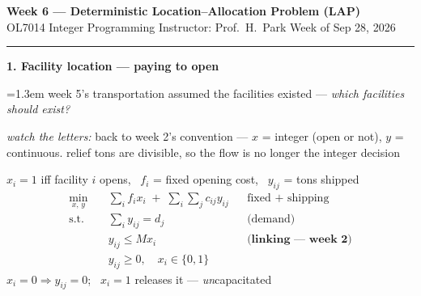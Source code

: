\documentclass[10pt]{article}
\newcommand{\beat}[2]{%
  \par\medskip\needspace{8\baselineskip}%
  {\color{ruleink}\rule{\textwidth}{1pt}}\par\nobreak\vspace{2pt}
  {\large\bfseries #1.\; #2}\par\nobreak\vspace{3pt}}
\newenvironment{board}{%
  \par\vspace{2pt}
  \begingroup\leftskip=1.3em\relax}{%
  \par\endgroup\vspace{2pt}}
\begin{document}
{\Large\bfseries Week 6 --- Deterministic Location--Allocation Problem (LAP)}\\[2pt]
{\small OL7014 Integer Programming \quad\textbullet\quad Instructor: Prof.\ H.\ Park \quad\textbullet\quad Week of Sep 28, 2026}

\beat{1}{Facility location --- paying to open}
\begin{board}
week 5's transportation assumed the facilities existed --- \emph{which facilities should exist?}
\vspace{2pt}

\emph{watch the letters:} back to week 2's convention --- $x$ = integer (open or not), $y$ = continuous.
relief tons are divisible, so the flow is no longer the integer decision
\vspace{2pt}

$x_i = 1$ iff facility $i$ opens, \ $f_i$ = fixed opening cost, \ $y_{ij}$ = tons shipped
\[
\begin{aligned}
  \min_{x,\,y}\quad & \textstyle\sum_{i} f_i x_i \;+\; \sum_{i} \sum_{j} c_{ij} y_{ij}
    && \text{fixed $+$ shipping} \\
  \text{s.t.}\quad
    & \textstyle\sum_{i} y_{ij} = d_j && \text{(demand)} \\
    & y_{ij} \le M x_i && \textbf{(linking --- week 2)} \\
    & y_{ij} \ge 0, \quad x_i \in \{0,1\}
\end{aligned}
\]
$x_i = 0 \Rightarrow y_{ij} = 0$; \ $x_i = 1$ releases it --- \emph{un}capacitated
\end{board}
\end{document}

